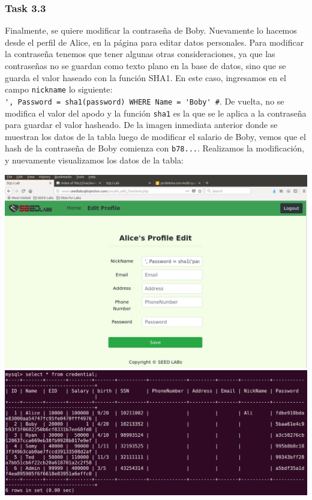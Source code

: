 \documentclass[11pt]{article}
\begin{document}
\subsubsection*{Task 3.3}
Finalmente, se quiere modificar la contraseña de Boby. Nuevamente lo hacemos desde el perfil de Alice, en la página 
para editar datos personales. Para modificar la contraseña tenemos que tener algunas otras consideraciones, ya que 
las contraseñas no se guardan como texto plano en la base de datos, sino que se guarda el valor haseado con la 
función SHA1. En este caso, ingresamos en el campo \verb|nickname| lo siguiente: \\
\verb|', Password = sha1(password) WHERE Name = 'Boby' #|. De vuelta, no se modifica el valor del apodo y la función 
\verb|sha1| es la que se le aplica a la contraseña para guardar el valor hasheado.
De la imagen inmediata anterior donde se muestran los datos de la tabla luego de modificar el salario de Boby, vemos
que el hash de la contraseña de Boby comienza con \verb|b78...|.
Realizamos la modificación, y nuevamente visualizamos los datos de la tabla:
\begin{center}
    \includegraphics[scale=.34]{task3_3_1_sql.png}
    \includegraphics[scale=.34]{task3_3_2_sql.png}
\end{center}
\end{document}
